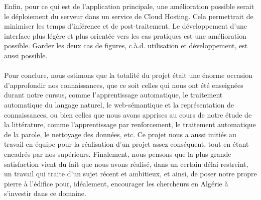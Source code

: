 \par
Enfin, pour ce qui est de l'application principale, une amélioration possible serait le déploiement du serveur dans un service de Cloud Hosting. Cela permettrait de minimiser les temps d'inférence et de post-traitement. Le développement d'une interface plus légère et plus orientée vers les cas pratiques est une amélioration possible. Garder les deux cas de figures, c.à.d. utilisation et développement, est aussi possible.

\paragraph{}
Pour conclure, nous estimons que la totalité du projet était une énorme occasion d'approfondir nos connaissances, que ce soit celles qui nous ont été enseignées durant notre cursus, comme l'apprentissage automatique, le traitement automatique du langage naturel, le web-sémantique et la représentation de connaissances, ou bien celles que nous avons apprises au cours de notre étude de la littérature, comme l'apprentissage par renforcement, le traitement automatique de la parole, le nettoyage des données, etc. Ce projet nous a aussi initiés au travail en équipe pour la réalisation d'un projet assez conséquent, tout en étant encadrés par nos supérieurs.
Finalement, nous pensons que la plus grande satisfaction vient du fait que nous avons réalisé, dans un certain délai restreint, un travail qui traite d'un sujet récent et ambitieux, et ainsi, de poser notre propre pierre à l'édifice pour, idéalement, encourager les chercheurs en Algérie à s'investir dans ce domaine. 

